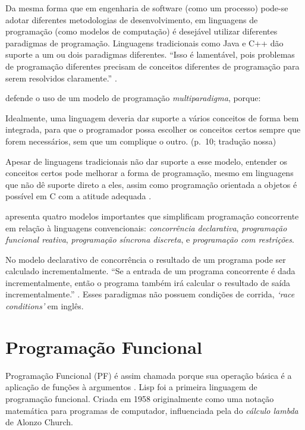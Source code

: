 Da mesma forma que em engenharia de software (como um processo) pode-se adotar
diferentes metodologias de desenvolvimento, em linguagens de programação (como
modelos de computação) é desejável utilizar diferentes paradigmas de
programação.
Linguagens tradicionais como Java e C++ dão suporte a um ou dois paradigmas
diferentes.
“Isso é lamentável, pois problemas de programação diferentes precisam de
conceitos diferentes de programação para serem resolvidos claramente.”
\cite[p. 10]{roy2009}.

\textcite{roy2009} defende o uso de um modelo de programação \emph{multiparadigma},
porque:

\begin{citacao}
  Idealmente, uma linguagem deveria dar suporte a vários conceitos de forma
  bem integrada, para que o programador possa escolher os conceitos certos
  sempre que forem necessários, sem que um complique o outro.
  (p.~10; tradução nossa)
\end{citacao}

Apesar de linguagens tradicionais não dar suporte a esse modelo, entender os
conceitos certos pode melhorar a forma de programação, mesmo em linguagens que
não dê suporte direto a eles, assim como programação orientada a objetos é
possível em C com a atitude adequada \cite{roy2009}.

\textcite{roy2009} apresenta quatro modelos importantes que simplificam
programação concorrente em relação à linguagens convencionais: \emph{concorrência
declarativa}, \emph{programação funcional reativa}, \emph{programação síncrona
discreta}, e \emph{programação com restrições}.

No modelo declarativo de concorrência o resultado de um programa pode ser
calculado incrementalmente.
“Se a entrada de um programa concorrente é dada incrementalmente, então o
programa também irá calcular o resultado de saída incrementalmente.”
\cite[p. 238; tradução nossa]{roy2004}.
Esses paradigmas não possuem condições de corrida, \emph{‘race conditions’} em
inglês.

\section{Programação Funcional}
\label{sec:org25e3cec}
Programação Funcional (PF) é assim chamada porque sua operação básica é a
aplicação de funções à argumentos \cite{hughes1990}.
Lisp foi a primeira linguagem de programação funcional.
Criada em 1958 originalmente como uma notação matemática para programas de
computador, influenciada pela do \emph{cálculo lambda} de Alonzo Church.

